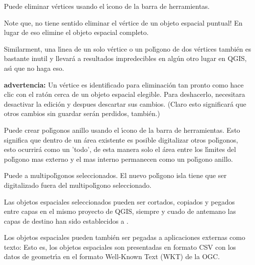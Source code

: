Puede eliminar v\'ertices usando el \'{\i}cono 
de la barra de herramientas.

Note que, no tiene sentido eliminar el v\'ertice de un objeto espacial puntual!
En lugar de eso elimine el objeto espacial completo.

Similarment, una l\'{\i}nea de un solo v\'ertice o un pol\'{\i}gono de dos v\'ertices también es
bastante inutil y llevar\'a a resultados impredecibles en alg\'un otro lugar en
QGIS, as\'{\i} que no haga eso.

\textbf{advertencia:} Un v\'ertice es identificado para eliminaci\'on tan pronto 
como hace clic con el rat\'on cerca de un objeto espacial elegible.
Para deshacerlo, necesitara desactivar
la edici\'on y despues descartar sus cambios.
(Claro esto significar\'a que otros cambios sin guardar ser\'an perdidos, también.)


Puede crear pol\'{\i}gonos anillo usando el \'{\i}cono 
de la barra de herramientas. Esto significa que dentro de un \'area existente es posible digitalizar
otros pol\'{\i}gonos, esto ocurrir\'a como un 'todo', de esta manera solo 
el \'area entre los l\'{\i}mites del pol\'{\i}gono mas externo y el mas interno permanecen 
como un pol\'{\i}gono anillo. 


Puede  a multipol\'{\i}gonos seleccionados. 
El nuevo pol\'{\i}gono isla tiene que ser digitalizado fuera del multipol\'{\i}gono seleccionado. 


Las objetos espaciales seleccionados pueden ser cortados, copiados y pegados entre capas en el mismo proyecto
de QGIS, siempre y cuado de antemano las capas de destino han sido establecidos a  
.

Los objetos espaciales pueden también ser pegadas a aplicaciones externas como texto:  Esto es,
los objetos espaciales son presentadas en formato CSV con los datos de geometr\'{\i}a 
en el formato Well-Known Text (WKT) de la OGC.


